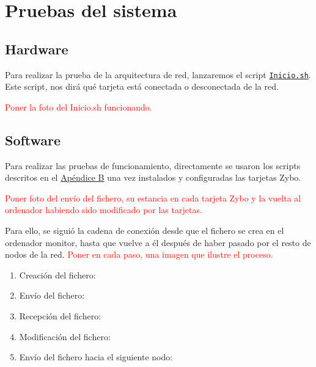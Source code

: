 \section{Pruebas del sistema}
\subsection{Hardware}
Para realizar la prueba de la arquitectura de red, lanzaremos el script \hyperlink{ScriptConexion}{\texttt{Inicio.sh}}. Este script, nos dirá qué tarjeta está conectada o desconectada de la red.

\textcolor{red}{Poner la foto del Inicio.sh funcionando.}

\subsection{Software}
Para realizar las pruebas de funcionamiento, directamente se usaron los scripts descritos en el \hyperlink{Scripts}{Apéndice B} una vez instalados y configuradas las tarjetas Zybo.

\textcolor{red}{Poner foto del envío del fichero, su estancia en cada tarjeta Zybo y la vuelta al ordenador habiendo sido modificado por las tarjetas.}

Para ello, se siguió la cadena de conexión desde que el fichero se crea en el ordenador monitor, hasta que vuelve a él después de haber pasado por el resto de nodos de la red. \textcolor{red}{Poner en cada paso, una imagen que ilustre el proceso.}
\begin{enumerate}
	\item Creación del fichero:
	\item Envío del fichero:
	\item Recepción del fichero:
	\item Modificación del fichero:
	\item Envío del fichero hacia el siguiente nodo:
\end{enumerate}